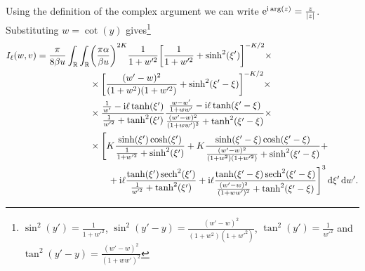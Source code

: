 \documentclass[english, parskip=full]{scrartcl}
\begin{document}
Using the definition of the complex argument we can write $\text{e}^{\text{i} \arg(z)} = \frac{z}{|z|}$.
Substituting $w = \cot(y)$ gives\footnote{$\sin^2(y') = \frac{1}{1 + w'^2}$, $\sin^2(y'-y) = \frac{(w'-w)^2}{(1+w^2)(1+w'^2)}$, $\tan^2(y') = \frac{1}{w'^2}$ and $\tan^2(y'-y) = \frac{(w'-w)^2}{(1 + ww')^2}$}
\begin{align}
\bsplit{I_\ell(w,v) = \frac{\pi}{8\beta u} \intr{\intr{&\kla*{\frac{\pi\alpha}{\beta u}}^{2K} \frac{1}{1 + w'^2} \klb*{\frac{1}{1 + w'^2} + \sinh^2(\xi')}^{-K/2} \times \\
&\times \klb*{\frac{(w'-w)^2}{(1+w^2)(1+w'^2)} + \sinh^2(\xi'-\xi)}^{-K/2} \times \\
&\times \frac{\frac{1}{w'} - \i\ell \tanh(\xi')}{\frac{1}{w'^2} + \tanh^2(\xi')} \frac{\frac{w - w'}{1 + ww'} - \i\ell \tanh(\xi'-\xi)}{\frac{(w'-w)^2}{(1+ww')^2} + \tanh^2(\xi'-\xi)} \times \\
&\times \klb[\Bigg]{K \frac{\sinh(\xi')\cosh(\xi')}{\frac{1}{1 + w'^2} + \sinh^2(\xi')} + K\frac{\sinh(\xi'-\xi) \cosh(\xi'-\xi)}{\frac{(w'-w)^2}{(1+w^2)(1+w'^2)} + \sinh^2(\xi'-\xi)} + \\
&\qquad + \i\ell \frac{\tanh(\xi') \sech^2(\xi')}{\frac{1}{w'^2} + \tanh^2(\xi')} + \i\ell \frac{\tanh(\xi'-\xi) \sech^2(\xi'-\xi)}{\frac{(w'-w)^2}{(1+ww')^2} + \tanh^2(\xi'-\xi)}}^3}{\xi'} }{w'}.}
\end{align}
\end{document}
